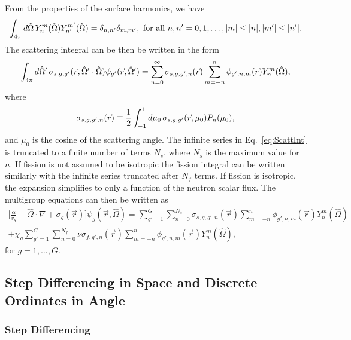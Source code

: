 From the properties of the surface harmonics, we have
\begin{equation}
	\int_{4\pi} \mathop{}\!d \hat{\Omega} \, Y_{n}^{m}(\hat{\Omega}) Y_{n'}^{m'}(\hat{\Omega}) = \delta_{n,n'} \delta_{m,m'}, \text{ for all } n, n' = 0, 1, \dots, \lvert m\rvert \leq \lvert n\rvert, \lvert m'\rvert \leq \lvert n'\rvert.
\end{equation}
The scattering integral can be then be written in the form
\begin{equation}
	\int_{4\pi} \mathop{}\!d \hat{\Omega}' \, \sigma_{s,g,g'}(\vec{r},\hat{\Omega}' \cdot \hat{\Omega}) \psi_{g'}(\vec{r},\hat{\Omega}') = \sum_{n=0}^{\infty} \sigma_{s,g,g',n}(\vec{r}) \sum_{m=-n}^{n} \phi_{g',n,m}(\vec{r})Y_{n}^{m}(\hat{\Omega}),
	\label{eq:ScattInt}
\end{equation}
where
\begin{equation}
	\sigma_{s,g,g',n}(\vec{r}) \equiv \frac{1}{2} \int_{-1}^{1} \mathop{}\!d \mu_{0} \, \sigma_{s,g,g'}(\vec{r},\mu_{0}) P_{n}(\mu_{0}),
\end{equation}
and $\mu_{0}$ is the cosine of the scattering angle. The infinite series in Eq.~\ref{eq:ScattInt} is truncated to a finite number of terms $N_{s}$, where $N_{s}$ is the maximum value for $n$. If fission is not assumed to be isotropic the fission integral can be written similarly with the infinite series truncated after $N_{f}$ terms. If fission is isotropic, the expansion simplifies to only a function of the neutron scalar flux. The multigroup equations can then be written as
\begin{multline}
	\bigg [ \frac{\alpha}{v_{g}} + \hat{\Omega} \cdot \nabla + \sigma_{g}(\vec{r}) \bigg ] \psi_{g}(\vec{r},\hat{\Omega}) = \sum_{g'=1}^{G} \sum_{n=0}^{N_{s}} \sigma_{s,g,g',n}(\vec{r}) \sum_{m=-n}^{n} \phi_{g',n,m}(\vec{r}) Y_{n}^{m}(\hat{\Omega}) \\ + \chi_{g} \sum_{g'=1}^{G} \sum_{n=0}^{N_{f}} \nu\sigma_{f,g',n}(\vec{r}) \sum_{m=-n}^{n} \phi_{g',n,m}(\vec{r}) Y_{n}^{m}(\hat{\Omega}), 
	\label{eq:Alpha3DMGSPH}
\end{multline}
for $g = 1, \dots, G$.

\subsection{Step Differencing in Space and Discrete Ordinates in Angle}

\subsubsection{Step Differencing}

